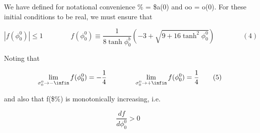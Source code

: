 \documentclass{article}
\begin{document}
We have defined for notational convenience \% = \$a(0) and oo = o(0). For these initial
conditions to be real, we must ensure that


\begin{equation}
| f ( \phi _ { 0 } ^ { 0 } ) | \leq 1 \qquad \qquad f ( \phi _ { 0 } ^ { 0 } ) \equiv \frac { 1 } { 8 \operatorname { t a n h } \phi _ { 0 } ^ { b } } \left ( - 3 + \sqrt { 9 + 1 6 \operatorname { t a n h } ^ { 2 } \phi _ { 0 } ^ { 0 } } \right ) \qquad \qquad ( 4 )
\end{equation}


Noting that


\begin{equation}
~ \operatorname * { l i m } _ { \sigma _ { 0 } ^ { 0 } \rightarrow - \infin } f ( \phi _ { 0 } ^ { 0 } ) = - \frac 1 4 \qquad \qquad \operatorname * { l i m } _ { \sigma _ { 0 } ^ { 0 } \rightarrow + \infin } f ( \phi _ { 0 } ^ { 0 } ) = \frac 1 4 \qquad ( 5 )
\end{equation}


and also that f(\$\%) is monotonically increasing, i.e.


\begin{equation}
\frac { d f } { d \phi _ { 0 } ^ { 0 } } > 0 ~
\end{equation}
\end{document}
